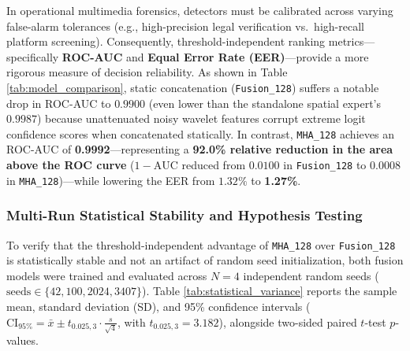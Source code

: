 \documentclass[fleqn,10pt]{wlscirep}
\begin{document}
In operational multimedia forensics, detectors must be calibrated across varying false-alarm tolerances (e.g., high-precision legal verification vs.\ high-recall platform screening). Consequently, threshold-independent ranking metrics---specifically \textbf{ROC-AUC} and \textbf{Equal Error Rate (EER)}---provide a more rigorous measure of decision reliability. As shown in Table \ref{tab:model_comparison}, static concatenation (\texttt{Fusion\_128}) suffers a notable drop in ROC-AUC to $0.9900$ (even lower than the standalone spatial expert's $0.9987$) because unattenuated noisy wavelet features corrupt extreme logit confidence scores when concatenated statically. In contrast, \texttt{MHA\_128} achieves an ROC-AUC of \textbf{0.9992}---representing a \textbf{92.0\% relative reduction in the area above the ROC curve} ($1 - \text{AUC}$ reduced from $0.0100$ in \texttt{Fusion\_128} to $0.0008$ in \texttt{MHA\_128})---while lowering the EER from $1.32\%$ to \textbf{1.27\%}.

\subsubsection*{Multi-Run Statistical Stability and Hypothesis Testing}
To verify that the threshold-independent advantage of \texttt{MHA\_128} over \texttt{Fusion\_128} is statistically stable and not an artifact of random seed initialization, both fusion models were trained and evaluated across $N = 4$ independent random seeds ($\text{seeds} \in \{42, 100, 2024, 3407\}$). Table \ref{tab:statistical_variance} reports the sample mean, standard deviation (SD), and 95\% confidence intervals ($\text{CI}_{95\%} = \bar{x} \pm t_{0.025, 3} \cdot \frac{s}{\sqrt{4}}$, with $t_{0.025, 3} = 3.182$), alongside two-sided paired $t$-test $p$-values.
\end{document}
